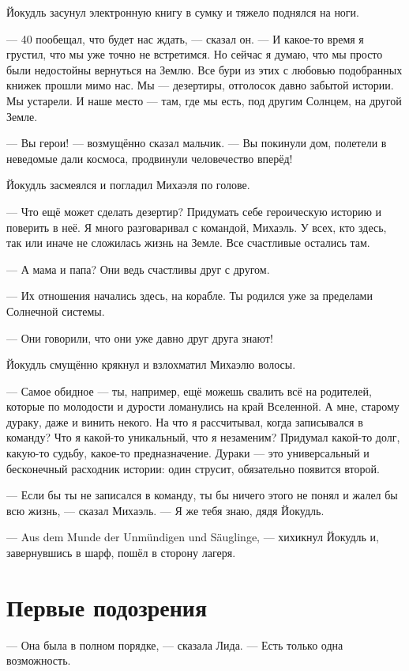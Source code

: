 \documentclass[a4paper,10pt,fleqn]{book}\usepackage{polyglossia}\setdefaultlanguage{english}\setotherlanguage{russian}\defaultfontfeatures{Ligatures=TeX,Mapping=tex-text}\usepackage{xcolor}\definecolor{lightgray}{HTML}{bbbbbb}\color{lightgray}\newcommand{\ml}[3]{\textcolor{black}{#3}}
\begin{document}
Йокудль засунул электронную книгу в сумку и тяжело поднялся на ноги.

--- 40 пообещал, что будет нас ждать, --- сказал он.
--- И какое-то время я грустил, что мы уже точно не встретимся.
Но сейчас я думаю, что мы просто были недостойны вернуться на Землю.
Все бури из этих с любовью подобранных книжек прошли мимо нас.
Мы --- дезертиры, отголосок давно забытой истории.
Мы устарели.
И наше место --- там, где мы есть, под другим Солнцем, на другой Земле.

--- Вы герои! --- возмущённо сказал мальчик.
--- Вы покинули дом, полетели в неведомые дали космоса, продвинули человечество вперёд!

Йокудль засмеялся и погладил Михаэля по голове.

--- Что ещё может сделать дезертир?
Придумать себе героическую историю и поверить в неё.
Я много разговаривал с командой, Михаэль.
У всех, кто здесь, так или иначе не сложилась жизнь на Земле.
Все счастливые остались там.

--- А мама и папа?
Они ведь счастливы друг с другом.

--- Их отношения начались здесь, на корабле.
Ты родился уже за пределами Солнечной системы.

--- Они говорили, что они уже давно друг друга знают!

Йокудль смущённо крякнул и взлохматил Михаэлю волосы.

--- Самое обидное --- ты, например, ещё можешь свалить всё на родителей, которые по молодости и дурости ломанулись на край Вселенной.
А мне, старому дураку, даже и винить некого.
На что я рассчитывал, когда записывался в команду?
Что я какой-то уникальный, что я незаменим?
Придумал какой-то долг, какую-то судьбу, какое-то предназначение.
Дураки --- это универсальный и бесконечный расходник истории: один струсит, обязательно появится второй.

--- Если бы ты не записался в команду, ты бы ничего этого не понял и жалел бы всю жизнь, --- сказал Михаэль.
--- Я же тебя знаю, дядя Йокудль.

--- Aus dem Munde der Unmündigen und Säuglinge, --- хихикнул Йокудль и, завернувшись в шарф, пошёл в сторону лагеря.

\section{Первые подозрения}

--- Она была в полном порядке, --- сказала Лида.
--- Есть только одна возможность.
\end{document}
